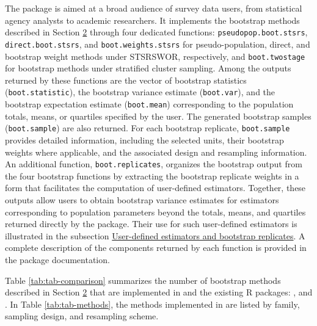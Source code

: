 The  package \citep{Mashreghi:2026} is aimed at a broad audience of survey data users, from statistical agency analysts to academic researchers. It implements the bootstrap methods described in Section \hyperref[BootSurvData]{2} through four dedicated functions: \texttt{pseudopop.boot.stsrs}, \texttt{direct.boot.stsrs}, and \texttt{boot.weights.stsrs} for pseudo-population, direct, and bootstrap weight methods under STSRSWOR, respectively, and \texttt{boot.twostage} for bootstrap methods under stratified cluster sampling. Among the outputs returned by these functions are the vector of bootstrap statistics (\texttt{boot.statistic}), the bootstrap variance estimate (\texttt{boot.var}), and the bootstrap expectation estimate (\texttt{boot.mean}) corresponding to the population totals, means, or quartiles specified by the user. The generated bootstrap samples (\texttt{boot.sample}) are also returned. For each bootstrap replicate, \texttt{boot.sample} provides detailed information, including the selected units, their bootstrap weights where applicable, and the associated design and resampling information. An additional function, \texttt{boot.replicates}, organizes the bootstrap output from the four bootstrap functions by extracting the bootstrap replicate weights in a form that facilitates the computation of user-defined estimators. Together, these outputs allow users to obtain bootstrap variance estimates for estimators corresponding to population parameters beyond the totals, means, and quartiles returned directly by the package. Their use for such user-defined estimators is illustrated in the subsection \hyperref[sec:userdefined]{User-defined estimators and bootstrap replicates}. A complete description of the components returned by each function is provided in the package documentation.

Table \ref{tab:tab-comparison} summarizes the number of bootstrap methods described in Section \hyperref[BootSurvData]{2} that are implemented in  and the existing R packages: ,  and . In Table \ref{tab:tab-methods}, the methods implemented in  are listed by family, sampling design, and resampling scheme.

